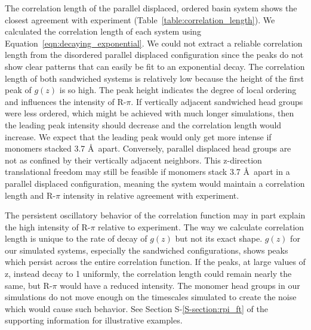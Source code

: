 \documentclass[journal=jpcbfk,manuscript=article]{achemso}
\begin{document}

  The correlation length of the parallel displaced, ordered basin system shows
  the closest agreement with experiment (Table~\ref{table:correlation_length}). We calculated the 
  correlation length of each system using Equation~\ref{eqn:decaying_exponential}. We could
  not extract a reliable correlation length from the disordered parallel displaced configuration
  since the peaks do not show clear patterns that can easily be fit to an exponential decay. The 
  correlation length of both sandwiched systems is relatively low because the height of the first
  peak of $g(z)$ is so high. The peak height indicates the degree of local ordering and influences
  the intensity of R-$\pi$. If vertically adjacent sandwiched head groups were less ordered, which
  might be achieved with much longer simulations, then the leading peak intensity should decrease and
  the correlation length would increase. We expect that the leading peak would only get more intense 
  if monomers stacked 3.7 \AA~apart. Conversely, parallel displaced head groups are not as confined
  by their vertically adjacent neighbors. This z-direction translational freedom may still be 
  feasible if monomers stack 3.7 \AA~apart in a parallel displaced configuration, meaning the system
  would maintain a correlation length and R-$\pi$ intensity in relative agreement with experiment.
  
  
  The persistent oscillatory behavior of the correlation function may in part explain the high
  intensity of R-$\pi$ relative to experiment. The way we calculate correlation length is
  unique to the rate of decay of $g(z)$ but not its exact shape. $g(z)$ for our 
  simulated systems, especially the sandwiched configurations, shows peaks which persist across
  the entire correlation function. If the peaks, at large values of z, instead decay to 1 uniformly,
  the correlation length could remain nearly the same, but R-$\pi$ would have a reduced intensity. 
  The monomer head groups in our simulations do not move enough on the timescales simulated to 
  create the noise which would cause such behavior. See Section S-\ref{S-section:rpi_ft} of the
  supporting information for illustrative examples.
  
\end{document}
